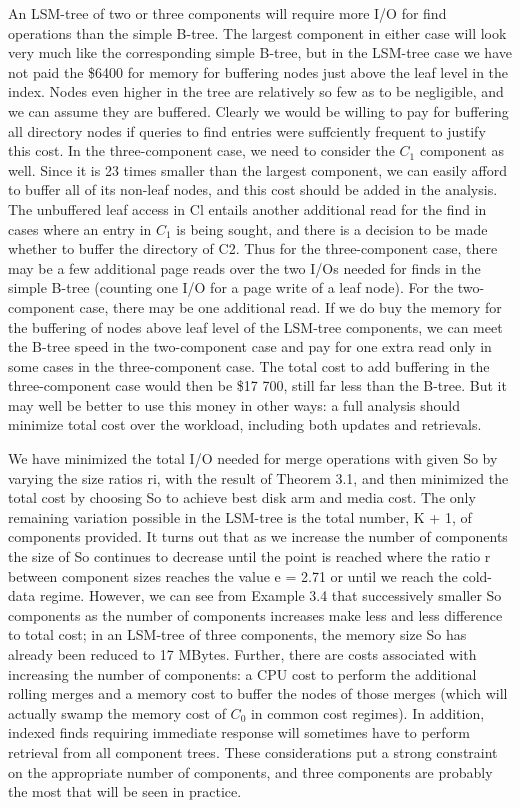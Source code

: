 \documentclass[a4paper,12pt,notitlepage,twoside,openright]{article}
\begin{document}
An LSM-tree of two or three components will require more I/O for find
operations than the simple B-tree. The largest component in either case
will look very much like the corresponding simple B-tree, but in the
LSM-tree case we have not paid the \$6400 for memory for buffering nodes
just above the leaf level in the index. Nodes even higher in the tree
are relatively so few as to be negligible, and we can assume they are
buffered. Clearly we would be willing to pay for buffering all directory
nodes if queries to find entries were suffciently frequent to justify
this cost. In the three-component case, we need to consider the \(C_1\)
component as well. Since it is 23 times smaller than the largest
component, we can easily afford to buffer all of its non-leaf nodes, and
this cost should be added in the analysis. The unbuffered leaf access in
Cl entails another additional read for the find in cases where an entry
in \(C_1\) is being sought, and there is a decision to be made whether to
buffer the directory of C2. Thus for the three-component case, there may
be a few additional page reads over the two I/Os needed for finds in the
simple B-tree (counting one I/O for a page write of a leaf node). For
the two-component case, there may be one additional read. If we do buy
the memory for the buffering of nodes above leaf level of the LSM-tree
components, we can meet the B-tree speed in the two-component case and
pay for one extra read only in some cases in the three-component case.
The total cost to add buffering in the three-component case would then
be \$17 700, still far less than the B-tree. But it may well be better
to use this money in other ways: a full analysis should minimize total
cost over the workload, including both updates and retrievals.

We have minimized the total I/O needed for merge operations with given
So by varying the size ratios ri, with the result of Theorem 3.1, and
then minimized the total cost by choosing So to achieve best disk arm
and media cost. The only remaining variation possible in the LSM-tree is
the total number, K + 1, of components provided. It turns out that as we
increase the number of components the size of So continues to decrease
until the point is reached where the ratio r between component sizes
reaches the value e = 2.71 or until we reach the cold-data regime.
However, we can see from Example 3.4 that successively smaller So
components as the number of components increases make less and less
difference to total cost; in an LSM-tree of three components, the memory
size So has already been reduced to 17 MBytes. Further, there are costs
associated with increasing the number of components: a CPU cost to
perform the additional rolling merges and a memory cost to buffer the
nodes of those merges (which will actually swamp the memory cost of \(C_0\)
in common cost regimes). In addition, indexed finds requiring immediate
response will sometimes have to perform retrieval from all component
trees. These considerations put a strong constraint on the appropriate
number of components, and three components are probably the most that
will be seen in practice.
\end{document}
